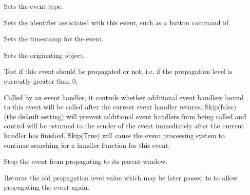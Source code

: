 
Sets the event type.

\label{wxeventsetid}


Sets the identifier associated with this event, such as a button command id.

\label{wxeventsettimestamp}


Sets the timestamp for the event.

Sets the originating object.

\label{wxeventshouldpropagate}


Test if this event should be propagated or not, i.e. if the propagation level
is currently greater than $0$.

\label{wxeventskip}


Called by an event handler, it controls whether additional event
handlers bound to this event will be called after the current event
handler returns.  Skip(false) (the default setting) will prevent
additional event handlers from being called and control will be
returned to the sender of the event immediately after the current
handler has finished.  Skip(True) will cause the event processing
system to continue searching for a handler function for this event.


\label{wxeventstoppropagation}


Stop the event from propagating to its parent window.

Returns the old propagation level value which may be later passed to 
 to allow propagating the
event again.

